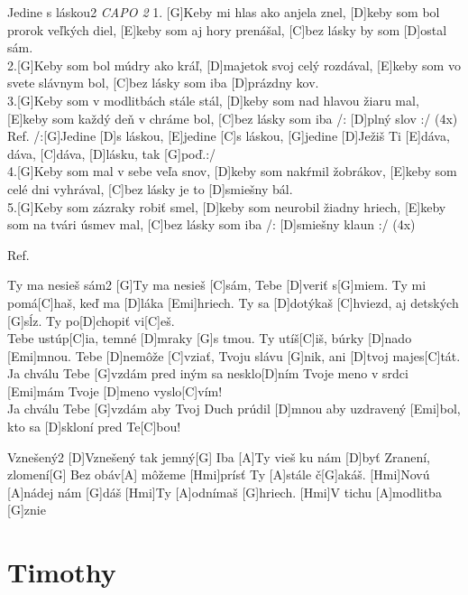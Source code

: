 \documentclass[12pt]{article}
\begin{document}
\begin{song}{Jedine s láskou}{2}
	\textit{CAPO 2}
	1.
	[G]Keby mi hlas ako anjela znel, [D]keby som bol prorok veľkých diel,
	[E]keby som aj hory prenášal, [C]bez lásky by som [D]ostal sám.
	\\
	2.[G]Keby som bol múdry ako kráľ, [D]majetok svoj celý rozdával,
	[E]keby som vo svete slávnym bol, [C]bez lásky som iba [D]prázdny kov.
	\\
	3.[G]Keby som v modlitbách stále stál, [D]keby som nad hlavou žiaru mal,
	[E]keby som každý deň v chráme bol, [C]bez lásky som iba /: [D]plný slov :/ (4x)
	\columnbreak
	Ref.
	/:[G]Jedine [D]s láskou, [E]jedine [C]s láskou,
	[G]jedine [D]Ježiš Ti [E]dáva, dáva, [C]dáva, [D]lásku, tak [G]poď.:/ 
	\\
	4.[G]Keby som mal v sebe veľa snov, [D]keby som nakŕmil žobrákov,
	[E]keby som celé dni vyhrával, [C]bez lásky je to [D]smiešny bál.
	\\
	5.[G]Keby som zázraky robiť smel, [D]keby som neurobil žiadny hriech,
	[E]keby som na tvári úsmev mal, [C]bez lásky som iba  /: [D]smiešny klaun :/ (4x)
	
	Ref.
\end{song}

\begin{song}{Ty ma nesieš sám}{2}
	[G]Ty ma nesieš [C]sám, Tebe [D]veriť s[G]miem.
	Ty mi pomá[C]haš, keď ma [D]láka [Emi]hriech.
	Ty sa [D]dotýkaš [C]hviezd, aj detských [G]sĺz.
	Ty po[D]chopiť vi[C]eš.
	\\
	[G]Tebe ustúp[C]ia, temné [D]mraky [G]s tmou.
	Ty utíš[C]iš, búrky [D]nado [Emi]mnou.
	Tebe [D]nemôže [C]vziať, Tvoju slávu [G]nik,
	ani [D]tvoj majes[C]tát.
	\columnbreak
	[C]Ja chválu Tebe [G]vzdám
	pred iným sa nesklo[D]ním
	Tvoje meno v srdci [Emi]mám
	Tvoje [D]meno vyslo[C]vím!
	\\
	[C]Ja chválu Tebe [G]vzdám
	aby Tvoj Duch prúdil [D]mnou
	aby uzdravený [Emi]bol,
	kto sa [D]skloní pred Te[C]bou!
\end{song}

\begin{song}{Vznešený}{2}
	[D]Vznešený tak jemný[G]
	Iba [A]Ty vieš ku nám [D]byť
	Zranení, zlomení[G]
	Bez obáv[A] môžeme [Hmi]prísť
	Ty [A]stále č[G]akáš. [Hmi]Novú [A]nádej nám [G]dáš
	[Hmi]Ty [A]odnímaš [G]hriech. [Hmi]V tichu [A]modlitba [G]znie
	\columnbreak
\end{song}

\newpage

\section{Timothy}
\end{document}
